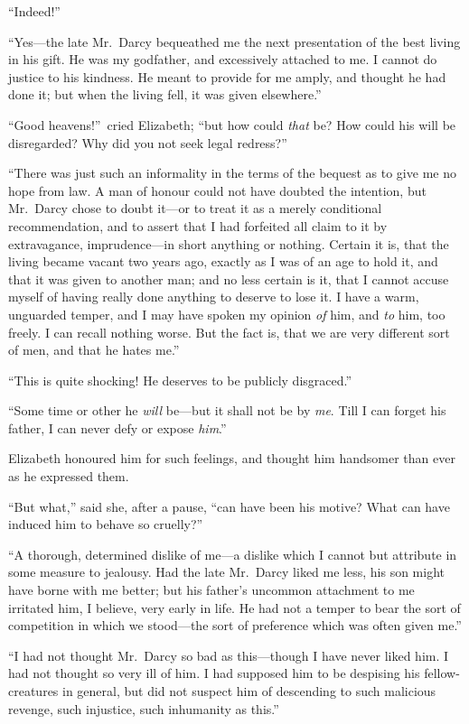\documentclass[12pt,english]{book}
\begin{document}
{}``Indeed!''\


{}``Yes\mbox{---}the late Mr.\ Darcy bequeathed me the next presentation
of the best living in his gift. He was my godfather, and excessively
attached to me. I cannot do justice to his kindness. He meant to provide
for me amply, and thought he had done it; but when the living fell,
it was given elsewhere.''

{}``Good heavens!''\ cried Elizabeth; {}``but how could \textit{that}
be? How could his will be disregarded? Why did you not seek legal
redress?''\ 

{}``There was just such an informality in the terms of the bequest
as to give me no hope from law. A man of honour could not have doubted
the intention, but Mr.\ Darcy chose to doubt it\mbox{---}or to treat
it as a merely conditional recommendation, and to assert that I had
forfeited all claim to it by extravagance, imprudence---in short anything
or nothing. Certain it is, that the living became vacant two years
ago, exactly as I was of an age to hold it, and that it was given
to another man; and no less certain is it, that I cannot accuse myself
of having really done anything to deserve to lose it. I have a warm,
unguarded temper, and I may have spoken my opinion \textit{of} him,
and \textit{to} him, too freely. I can recall nothing worse. But the
fact is, that we are very different sort of men, and that he hates
me.''

{}``This is quite shocking! He deserves to be publicly disgraced.''

{}``Some time or other he \textit{will} be\mbox{---}but it shall
not be by \textit{me}. Till I can forget his father, I can never defy
or expose \textit{him}.''

Elizabeth honoured him for such feelings, and thought him handsomer
than ever as he expressed them.

{}``But what,'' said she, after a pause, {}``can have been his
motive? What can have induced him to behave so cruelly?''\ 

{}``A thorough, determined dislike of me\mbox{---}a dislike which
I cannot but attribute in some measure to jealousy. Had the late Mr.\ Darcy
liked me less, his son might have borne with me better; but his father's
uncommon attachment to me irritated him, I believe, very early in
life. He had not a temper to bear the sort of competition in which
we stood\mbox{---}the sort of preference which was often given me.''

{}``I had not thought Mr.\ Darcy so bad as this\mbox{---}though
I have never liked him. I had not thought so very ill of him. I had
supposed him to be despising his fellow-creatures in general, but
did not suspect him of descending to such malicious revenge, such
injustice, such inhumanity as this.''
\end{document}
